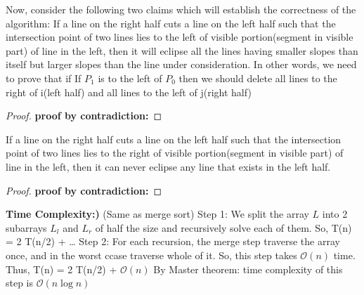 \documentclass[11pt]{article}
\renewcommand{\O}{\mathcal{O}}
\begin{document}
Now, consider the following two claims which will establish the correctness of the algorithm: \newline
{} If a line on the right half cuts a line on the left half such that the intersection point of two lines
lies to the left of visible portion(segment in visible part) of line in the left, then it will eclipse all the lines 
having smaller slopes than itself but larger slopes than the line under consideration. \newline
In other words, we need to prove that if If $P_1$ is to the left of $P_0$ then we should delete all lines
to the right of i(left half) and all lines to the left of j(right half)
\begin{proof}
{\bf proof by contradiction:} 
\end{proof}
 If a line on the right half cuts a line on the left half such that the intersection point of two lines
lies to the right of visible portion(segment in visible part) of line in the left, then it can never eclipse any line that 
exists in the left half. \newline
\begin{proof}
{\bf proof by contradiction:} 
\end{proof}

{\bf Time Complexity:)} (Same as merge sort) \newline
Step 1: We split the array $L$ into 2 subarrays $L_l$ and $L_r$ of half the size and recursively solve each of them. 
So, T(n) = 2 T(n/2) + \dots \newline
Step 2: For each recursion, the merge step traverse the array once, and in the worst ccase traverse whole of it. \newline
So, this step takes $\O(n)$ time. \newline
Thus, T(n) = 2 T(n/2) + $\O(n)$ \newline
By Master theorem: time complexity of this step is $\O(n\log n)$ \newline
\end{document}
